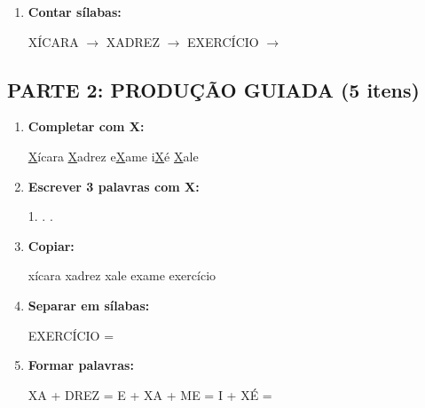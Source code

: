 \begin{exercicio}
\begin{enumerate}
  \item \textbf{Contar sílabas:}
  \begin{center}
  XÍCARA $\rightarrow$ \underline{\hspace{1cm}} \quad XADREZ $\rightarrow$ \underline{\hspace{1cm}} \quad EXERCÍCIO $\rightarrow$ \underline{\hspace{1cm}}
  \end{center}
\end{enumerate}

\subsection*{PARTE 2: PRODUÇÃO GUIADA (5 itens)}

\begin{enumerate}[resume]
  \item \textbf{Completar com X:}
  \begin{center}
  \underline{X}ícara \quad \underline{X}adrez \quad e\underline{X}ame \quad i\underline{X}é \quad \underline{X}ale
  \end{center}

  \item \textbf{Escrever 3 palavras com X:}
  \begin{center}
  1. \underline{\hspace{3cm}} . \underline{\hspace{3cm}} . \underline{\hspace{3cm}}
  \end{center}

  \item \textbf{Copiar:}
  \begin{center}
  xícara \quad xadrez \quad xale \quad exame \quad exercício
  \end{center}

  \item \textbf{Separar em sílabas:}
  \begin{center}
  EXERCÍCIO = \underline{\hspace{1cm}} \underline{\hspace{1cm}} \underline{\hspace{1cm}} \underline{\hspace{1cm}} \underline{\hspace{1cm}}
  \end{center}

  \item \textbf{Formar palavras:}
  \begin{center}
  XA + DREZ = \underline{\hspace{2cm}} \quad E + XA + ME = \underline{\hspace{2cm}} \quad I + XÉ = \underline{\hspace{2cm}}
  \end{center}
\end{enumerate}


\end{exercicio}
